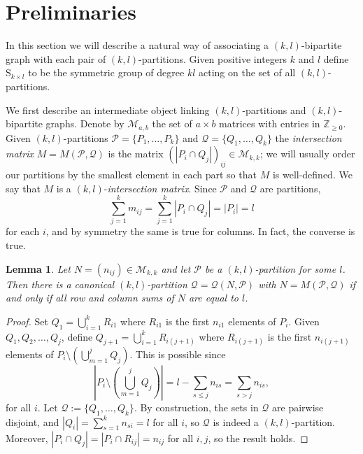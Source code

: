 \documentclass{daj}
\renewcommand\S{\mathrm{S}}
\theoremstyle{plain}
\newtheorem{lemma}[theorem]{Lemma}
\theoremstyle{definition}
\begin{document}
\section{Preliminaries}\label{prelim}
In this section we will describe a natural way of associating a $(k,l)$-bipartite graph with each pair of $(k,l)$-partitions. Given positive integers $k$ and $l$ define $\S_{k\times l}$ to be the symmetric group of degree $kl$ acting on the set of all $(k,l)$-partitions. 

We first describe an intermediate object linking $(k,l)$-partitions and $(k,l)$-bipartite graphs. 
Denote by $\mathcal{M}_{a,b}$ the set of $a\times b$ matrices with entries in $\mathbb{Z}_{\geq 0}$.
Given $(k,l)$-partitions $\mathcal{P}=\{P_1,\dots, P_k\}$ and $\mathcal{Q}=\{Q_1,\dots, Q_k\}$ the \emph{intersection matrix} $M=M(\mathcal{P},\mathcal{Q})$ is the matrix $(|P_i\cap Q_j|)_{ij}\in\mathcal{M}_{k,k}$; we will usually order our partitions by the smallest element in each part so that $M$ is well-defined. We say that $M$ is a $(k,l)$-\emph{intersection matrix}. 
Since $\mathcal{P}$ and $\mathcal{Q}$ are partitions, $$\sum_{j=1}^k m_{ij}=\sum_{j=1}^k|P_{i}\cap Q_{j}|=|P_{i}|=l$$ for each $i$, and by symmetry the same is true for columns. In fact, the converse is true.

\begin{lemma}\label{mat}
Let $N=(n_{ij})\in\mathcal{M}_{k,k}$ and let $\mathcal{P}$ be a $(k,l)$-partition for some $l$. Then there is a canonical $(k,l)$-partition $\mathcal{Q}=\mathcal{Q}(N,\mathcal{P})$ with $N=M(\mathcal{P},\mathcal{Q})$ if and only if all row and column sums of $N$ are equal to $l$.
\end{lemma}
\begin{proof}
Set $Q_{1}=\bigcup_{i=1}^k R_{i1}$ where $R_{i1}$ is the first $n_{i1}$ elements of $P_i$. Given $Q_{1},Q_{2},\dots,Q_{j}$, define $Q_{j+1}=\bigcup_{i=1}^k R_{i(j+1)}$ where $R_{i(j+1)}$ is the first $n_{i(j+1)}$ elements of $P_{i}\setminus\left( \bigcup_{m=1}^j Q_{j}\right)$. This is possible since $$\left|P_{i}\setminus\left( \bigcup_{m=1}^j Q_{j}\right)\right|=l-\sum_{s\leq j} n_{is}=\sum_{s>j} n_{is},$$ for all $i$. Let $\mathcal{Q}:=\{Q_{1},\dots, Q_{k}\}$. By construction, the sets in $\mathcal{Q}$ are pairwise disjoint, and $|Q_{i}|=\sum_{s=1}^k n_{si}=l$ for all $i$, so $\mathcal{Q}$ is indeed a $(k,l)$-partition. Moreover, $|P_{i}\cap Q_{j}|=|P_{i}\cap R_{ij}|=n_{ij}$ for all $i,j$, so the result holds.
\end{proof}
\end{document}
